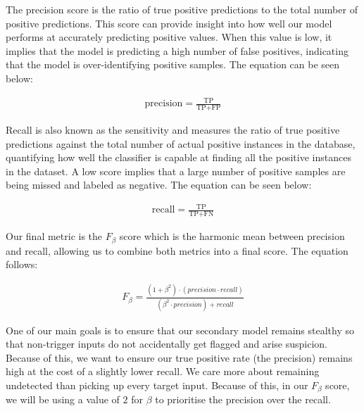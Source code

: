 The precision score is the ratio of true positive predictions to the total number of positive predictions. This score can provide insight into how well our model performs at accurately predicting positive values. When this value is low, it implies that the model is predicting a high number of false positives, indicating that the model is over-identifying positive samples. The equation can be seen below:

\begin{equation}
    \begin{gathered}
        \text{precision} = \frac{\text{TP}}{\text{TP} + \text{FP}}
    \end{gathered}
    \label{eq:precision}
\end{equation}

Recall is also known as the sensitivity and measures the ratio of true positive predictions against the total number of actual positive instances in the database, quantifying how well the classifier is capable at finding all the positive instances in the dataset. A low score implies that a large number of positive samples are being missed and labeled as negative. The equation can be seen below:

\begin{equation}
    \begin{gathered}
        \text{recall} = \frac{\text{TP}}{\text{TP} + \text{FN}}
    \end{gathered}
    \label{eq:recall}
\end{equation}

Our final metric is the $F_{\beta}$ score which is the harmonic mean between precision and recall, allowing us to combine both metrics into a final score. The equation follows:

\begin{equation}
    \begin{gathered}
        F_{\beta} = \frac{{(1 + \beta^2) \cdot (precision \cdot recall)}}{{(\beta^2 \cdot precision) + recall}}
    \end{gathered}
    \label{eq:f_beta}
\end{equation}

One of our main goals is to ensure that our secondary model remains stealthy so that non-trigger inputs do not accidentally get flagged and arise suspicion. Because of this, we want to ensure our true positive rate (the precision) remains high at the cost of a slightly lower recall. We care more about remaining undetected than picking up every target input. Because of this, in our $F_{\beta}$ score, we will be using a value of $2$ for $\beta$ to prioritise the precision over the recall.

